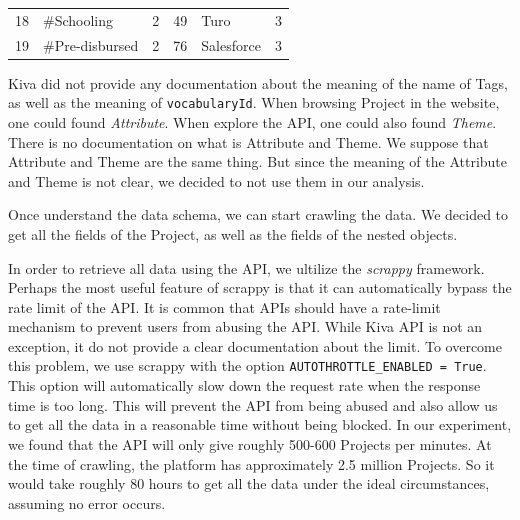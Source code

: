 \begin{longtable}{|r|l|l|r|l|l|}
	18                                & \#Schooling                        & 2                                                       & 49                               & Turo                                & 3                                                      \\
	19                                & \#Pre-disbursed                    & 2                                                       & 76                               & Salesforce                          & 3                                                      \\
\end{longtable}


Kiva did not provide any documentation about the meaning of the name of Tags,
as well as the meaning of \lstinline|vocabularyId|.
When browsing Project in the website, one could found \textit{Attribute}.
When explore the API, one could also found \textit{Theme}.
There is no documentation on what is Attribute and Theme.
We suppose that Attribute and Theme are the same thing.
But since the meaning of the Attribute and Theme is not clear,
we decided to not use them in our analysis.

Once understand the data schema, we can start crawling the data.
We decided to get all the fields of the Project, as well as the fields of the nested objects.

In order to retrieve all data using the API, we ultilize the \textit{scrappy}\cite{scrappy} framework.
Perhaps the most useful feature of scrappy is that it can automatically bypass the rate limit of the API.
It is common that APIs should have a rate-limit mechanism to prevent users from abusing the API.
While Kiva API is not an exception, it do not provide a clear documentation about the limit.
To overcome this problem, we use scrappy with the option \lstinline|AUTOTHROTTLE_ENABLED = True|.
This option will automatically slow down the request rate when the response time is too long.
This will prevent the API from being abused and also allow us to get all the data in a reasonable time without being blocked.
In our experiment, we found that the API will only give roughly 500-600 Projects per minutes.
At the time of crawling, the platform has approximately 2.5 million Projects.
So it would take roughly 80 hours to get all the data under the ideal circumstances, assuming no error occurs.

